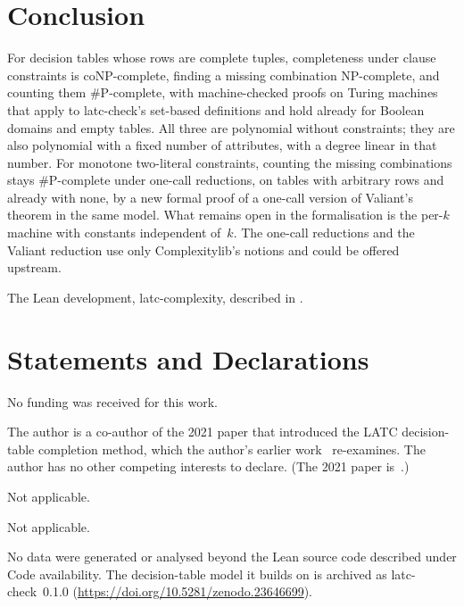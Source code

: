 \documentclass[pdflatex,sn-mathphys-num]{sn-jnl}
\theoremstyle{thmstyleone}
\theoremstyle{thmstylethree}
\begin{document}
\section{Conclusion}
\label{sec:conclusion}

For decision tables whose rows are complete tuples, completeness under clause constraints is
coNP-complete, finding a missing combination NP-complete, and counting them \#P-complete, with
machine-checked proofs on Turing machines that apply to latc-check's set-based definitions and
hold already for Boolean domains and empty tables. All three are polynomial without
constraints; they are also polynomial with a fixed number of attributes, with a degree linear in
that number. For monotone two-literal constraints, counting the missing combinations stays
\#P-complete under one-call reductions, on tables with arbitrary rows and already with none, by
a new formal proof of a one-call version of Valiant's theorem in the same model. What remains
open in the formalisation is the per-$k$ machine with constants independent of~$k$. The one-call
reductions and the Valiant reduction use only Complexitylib's notions and could be offered
upstream.

\backmatter

The Lean development, latc-complexity, described in .

\section*{Statements and Declarations}

No funding was received for this work.

The author is a co-author of the 2021 paper that introduced the LATC
decision-table completion method, which the author's earlier work~\cite{PaperA} re-examines.
The author has no other competing interests to declare. (The 2021 paper is~\cite{RaggioRussell2021}.)

Not applicable.

Not applicable.

No data were generated or analysed beyond the Lean source code described
under Code availability. The decision-table model it builds on is archived as latc-check~0.1.0
(\url{https://doi.org/10.5281/zenodo.23646699}).
\end{document}
